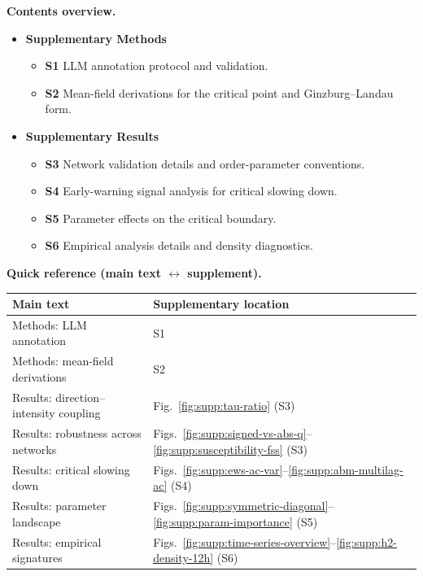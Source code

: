 \documentclass[11pt]{article}
\begin{document}
\noindent\textbf{Contents overview.}
\begin{itemize}
  \item \textbf{Supplementary Methods}
  \begin{itemize}
    \item \textbf{S1} LLM annotation protocol and validation.
    \item \textbf{S2} Mean-field derivations for the critical point and Ginzburg--Landau form.
  \end{itemize}
  \item \textbf{Supplementary Results}
  \begin{itemize}
    \item \textbf{S3} Network validation details and order-parameter conventions.
    \item \textbf{S4} Early-warning signal analysis for critical slowing down.
    \item \textbf{S5} Parameter effects on the critical boundary.
    \item \textbf{S6} Empirical analysis details and density diagnostics.
  \end{itemize}
\end{itemize}
\vspace{0.4em}
\noindent\textbf{Quick reference (main text $\leftrightarrow$ supplement).}
\begin{center}
  \footnotesize
  \begin{tabular}{@{}ll@{}}
    \toprule
    Main text & Supplementary location \\
    \midrule
    Methods: LLM annotation & S1 \\
    Methods: mean-field derivations & S2 \\
    Results: direction--intensity coupling & Fig.~\ref{fig:supp:tau-ratio} (S3) \\
    Results: robustness across networks & Figs.~\ref{fig:supp:signed-vs-abs-q}--\ref{fig:supp:susceptibility-fss} (S3) \\
    Results: critical slowing down & Figs.~\ref{fig:supp:ews-ac-var}--\ref{fig:supp:abm-multilag-ac} (S4) \\
    Results: parameter landscape & Figs.~\ref{fig:supp:symmetric-diagonal}--\ref{fig:supp:param-importance} (S5) \\
    Results: empirical signatures & Figs.~\ref{fig:supp:time-series-overview}--\ref{fig:supp:h2-density-12h} (S6) \\
    \bottomrule
  \end{tabular}
\end{center}
\end{document}
